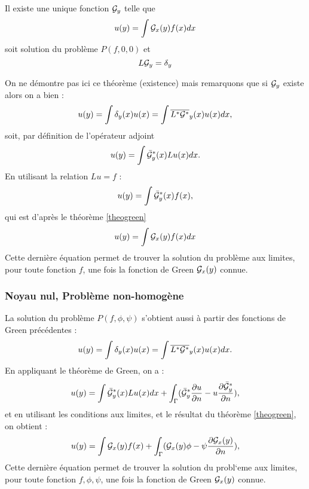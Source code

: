 \documentclass[12pt]{book}
\begin{document}
\begin{thm}
Il existe une unique fonction ${\cal G}_y$ telle que
\begin{equation}
u(y)=\int {\cal G}_x(y) f(x)dx
\end{equation}
soit solution du probl\`eme $P(f,0,0)$ 
et
\begin{equation}
L{\cal G}_y=\delta_y
\end{equation}
\end{thm}
On ne d\'emontre pas ici ce th\'eor\`eme (existence) mais remarquons
que si 
${\cal G}_y$ existe alors on a bien :
\begin{equation}
u(y)=\int \delta_y(x)u(x)=\int \overline{L^*{\cal G}^*}_y(x) u(x)dx,
\end{equation}
soit, par d\'efinition de l'op\'erateur adjoint 
\begin{equation}
u(y)=\int \bar{\cal G}^*_y(x) Lu(x)dx.
\end{equation}
En utilisant la relation $Lu=f$ :
\begin{equation}
u(y)=\int \bar{\cal G}^*_y(x) f(x),
\end{equation}
qui est d'apr\`es le th\'eor\`eme \ref{theogreen}
\begin{equation}
u(y)=\int {\cal G}_x(y) f(x)dx
\end{equation}
Cette derni\`ere \'equation permet de trouver la solution du probl\`eme
aux limites, pour toute fonction $f$, une fois la fonction de Green
${\cal G}_x(y)$ connue.

\subsubsection{Noyau nul, Probl\`eme non-homog\`ene}
La solution du probl\`eme $P(f,\phi,\psi)$ s'obtient 
aussi \`a partir des fonctions de Green pr\'ec\'edentes :
\begin{equation}
u(y)=\int \delta_y(x)u(x)=\int \overline{L^*{\cal G^*}}_y(x)u(x)dx.
\end{equation}
En appliquant le th\'eor\`eme de Green, on a :
\begin{equation}
u(y)=\int \bar{\cal G}^*_y(x) Lu(x)dx
+\int_\Gamma  (\bar{\cal G}^*_y\frac{\partial u}{\partial
n}-u\frac{\partial \bar{\cal G}^*_y}{\partial n}),
\end{equation}
et en utilisant les conditions aux limites, et le r\'esultat du
th\'eor\`eme \ref{theogreen}, on obtient :
\begin{equation}
u(y)=\int {\cal G}_x(y) f(x)+\int_\Gamma  ({\cal
G}_x(y)\phi-\psi\frac{\partial {\cal G}_x(y)}{\partial n}), 
\end{equation}
Cette derni\`ere \'equation permet de trouver la solution du probl`eme
aux limites, pour toute fonction $f,\phi,\psi$, une fois la fonction
de Green 
${\cal G}_x(y)$ connue.
\end{document}

